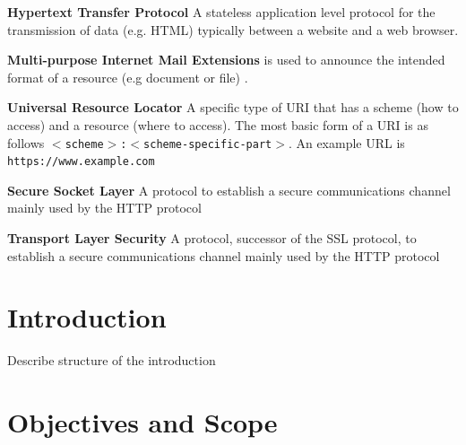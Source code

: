 \documentclass{mscreport}
\begin{document}
\begin{hangparas}{.25in}{1}
\textbf{Hypertext Transfer Protocol} A stateless application level protocol \cite{Berners-Lee1996-ji} for the transmission of data (e.g. HTML) typically between a website and a web browser. \par
\vspace{0.5cm}
\textbf{Multi-purpose Internet Mail Extensions} is used to announce the intended format of a resource (e.g document or file) \cite{Freed2013-yn}. \par
\vspace{0.5cm}
\textbf{Universal Resource Locator} A specific type of URI that has a scheme (how to access) and a resource (where to access). The most basic form of a URI is as follows \texttt{$<$scheme$>$:$<$scheme-specific-part$>$}. An example URL is \newline \texttt{https://www.example.com} \par
\vspace{0.5cm}
\textbf{Secure Socket Layer} A protocol to establish a secure communications channel mainly used by the HTTP protocol \par
\vspace{0.5cm}
\textbf{Transport Layer Security} A protocol, successor of the SSL protocol, to establish a secure communications channel mainly used by the HTTP protocol \par

\end{hangparas}
\clearpage
\newpage

\listoffigures

\clearpage
\newpage
{}
\listoftables

\clearpage
\newpage





\tableofcontents

\newpage
{}
\section{Introduction}
\label{section:intro}

Describe structure of the introduction

\section{Objectives and Scope}
\end{document}
